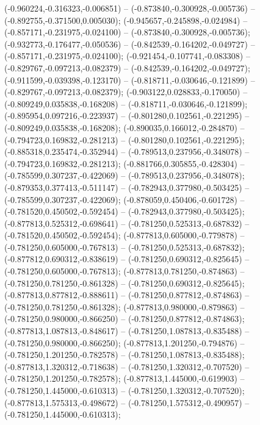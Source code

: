 (-0.960224,-0.316323,-0.006851) -- (-0.873840,-0.300928,-0.005736) -- (-0.892755,-0.371500,0.005030);
 (-0.945657,-0.245898,-0.024984) -- (-0.857171,-0.231975,-0.024100) -- (-0.873840,-0.300928,-0.005736);
 (-0.932773,-0.176477,-0.050536) -- (-0.842539,-0.164202,-0.049727) -- (-0.857171,-0.231975,-0.024100);
 (-0.921454,-0.107741,-0.083308) -- (-0.829767,-0.097213,-0.082379) -- (-0.842539,-0.164202,-0.049727);
 (-0.911599,-0.039398,-0.123170) -- (-0.818711,-0.030646,-0.121899) -- (-0.829767,-0.097213,-0.082379);
 (-0.903122,0.028833,-0.170050) -- (-0.809249,0.035838,-0.168208) -- (-0.818711,-0.030646,-0.121899);
 (-0.895954,0.097216,-0.223937) -- (-0.801280,0.102561,-0.221295) -- (-0.809249,0.035838,-0.168208);
 (-0.890035,0.166012,-0.284870) -- (-0.794723,0.169832,-0.281213) -- (-0.801280,0.102561,-0.221295);
 (-0.885318,0.235474,-0.352944) -- (-0.789513,0.237956,-0.348078) -- (-0.794723,0.169832,-0.281213);
 (-0.881766,0.305855,-0.428304) -- (-0.785599,0.307237,-0.422069) -- (-0.789513,0.237956,-0.348078);
 (-0.879353,0.377413,-0.511147) -- (-0.782943,0.377980,-0.503425) -- (-0.785599,0.307237,-0.422069);
 (-0.878059,0.450406,-0.601728) -- (-0.781520,0.450502,-0.592454) -- (-0.782943,0.377980,-0.503425);
 (-0.877813,0.525312,-0.698641) -- (-0.781250,0.525313,-0.687832) -- (-0.781520,0.450502,-0.592454);
 (-0.877813,0.605000,-0.779878) -- (-0.781250,0.605000,-0.767813) -- (-0.781250,0.525313,-0.687832);
 (-0.877812,0.690312,-0.838619) -- (-0.781250,0.690312,-0.825645) -- (-0.781250,0.605000,-0.767813);
 (-0.877813,0.781250,-0.874863) -- (-0.781250,0.781250,-0.861328) -- (-0.781250,0.690312,-0.825645);
 (-0.877813,0.877812,-0.888611) -- (-0.781250,0.877812,-0.874863) -- (-0.781250,0.781250,-0.861328);
 (-0.877813,0.980000,-0.879863) -- (-0.781250,0.980000,-0.866250) -- (-0.781250,0.877812,-0.874863);
 (-0.877813,1.087813,-0.848617) -- (-0.781250,1.087813,-0.835488) -- (-0.781250,0.980000,-0.866250);
 (-0.877813,1.201250,-0.794876) -- (-0.781250,1.201250,-0.782578) -- (-0.781250,1.087813,-0.835488);
 (-0.877813,1.320312,-0.718638) -- (-0.781250,1.320312,-0.707520) -- (-0.781250,1.201250,-0.782578);
 (-0.877813,1.445000,-0.619903) -- (-0.781250,1.445000,-0.610313) -- (-0.781250,1.320312,-0.707520);
 (-0.877813,1.575313,-0.498672) -- (-0.781250,1.575312,-0.490957) -- (-0.781250,1.445000,-0.610313);
